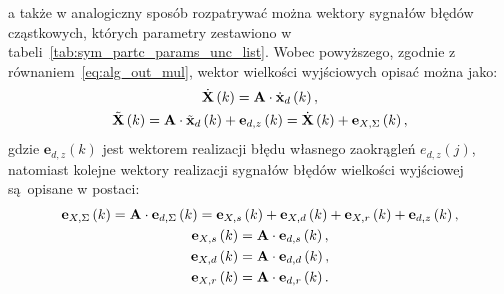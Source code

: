 a także w analogiczny sposób rozpatrywać można wektory sygnałów błędów cząstkowych, których parametry zestawiono w tabeli~\ref{tab:sym_partc_params_unc_list}. Wobec powyższego, zgodnie z równaniem~\eqref{eq:alg_out_mul}, wektor wielkości wyjściowych opisać można jako:
\begin{gather}
\dot{\mathbf{X}} \left(k\right) = \mathbf{A} \cdot \dot{\mathbf{x}}_{d} \left(k\right) \label{eq:sym_partd_output_ideal}, \\
\tilde{\mathbf{X}} \left(k\right) = \mathbf{A} \cdot \tilde{\mathbf{x}}_{d} \left(k\right) + \mathbf{e}_{d,z} \left(k\right) = \dot{\mathbf{X}} \left(k\right) + \mathbf{e}_{X,\Sigma} \left(k\right) \label{eq:sym_partd_output_real},
\end{gather}
gdzie $\mathbf{e}_{d,z}(k)$ jest wektorem realizacji błędu własnego zaokrągleń $e_{d,z}(j)$, natomiast kolejne wektory realizacji sygnałów błędów wielkości wyjściowej są opisane w postaci:
\begin{gather}
\mathbf{e}_{X,\Sigma} \left(k\right) = \mathbf{A} \cdot \mathbf{e}_{d,\Sigma} \left(k\right) = \mathbf{e}_{X,s} \left(k\right) + \mathbf{e}_{X,d} \left(k\right) + \mathbf{e}_{X,r} \left(k\right) + \mathbf{e}_{d,z} \left(k\right) \label{eq:sym_partd_output_error_sum}, \\
\mathbf{e}_{X,s} \left(k\right) = \mathbf{A} \cdot \mathbf{e}_{d,s} \left(k\right) \label{eq:sym_partd_output_error_stat}, \\
\mathbf{e}_{X,d} \left(k\right) = \mathbf{A} \cdot \mathbf{e}_{d,d} \left(k\right) \label{eq:sym_partd_output_error_dyn}, \\
\mathbf{e}_{X,r} \left(k\right) = \mathbf{A} \cdot \mathbf{e}_{d,r} \left(k\right) \label{eq:sym_partd_output_error_rand}.
\end{gather}

